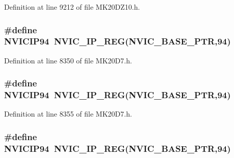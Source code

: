 Definition at line 9212 of file M\+K20\+D\+Z10.\+h.

\subsubsection[{\texorpdfstring{N\+V\+I\+C\+I\+P94}{NVICIP94}}]{\setlength{\rightskip}{0pt plus 5cm}\#define N\+V\+I\+C\+I\+P94~{\bf N\+V\+I\+C\+\_\+\+I\+P\+\_\+\+R\+EG}({\bf N\+V\+I\+C\+\_\+\+B\+A\+S\+E\+\_\+\+P\+TR},94)}\hypertarget{group___n_v_i_c___register___accessor___macros_ga1fdffabe7e9138a3d4d06f44da25cb32}{}\label{group___n_v_i_c___register___accessor___macros_ga1fdffabe7e9138a3d4d06f44da25cb32}


Definition at line 8350 of file M\+K20\+D7.\+h.

\subsubsection[{\texorpdfstring{N\+V\+I\+C\+I\+P94}{NVICIP94}}]{\setlength{\rightskip}{0pt plus 5cm}\#define N\+V\+I\+C\+I\+P94~{\bf N\+V\+I\+C\+\_\+\+I\+P\+\_\+\+R\+EG}({\bf N\+V\+I\+C\+\_\+\+B\+A\+S\+E\+\_\+\+P\+TR},94)}\hypertarget{group___n_v_i_c___register___accessor___macros_ga1fdffabe7e9138a3d4d06f44da25cb32}{}\label{group___n_v_i_c___register___accessor___macros_ga1fdffabe7e9138a3d4d06f44da25cb32}


Definition at line 8355 of file M\+K20\+D7.\+h.

\subsubsection[{\texorpdfstring{N\+V\+I\+C\+I\+P94}{NVICIP94}}]{\setlength{\rightskip}{0pt plus 5cm}\#define N\+V\+I\+C\+I\+P94~{\bf N\+V\+I\+C\+\_\+\+I\+P\+\_\+\+R\+EG}({\bf N\+V\+I\+C\+\_\+\+B\+A\+S\+E\+\_\+\+P\+TR},94)}\hypertarget{group___n_v_i_c___register___accessor___macros_ga1fdffabe7e9138a3d4d06f44da25cb32}{}\label{group___n_v_i_c___register___accessor___macros_ga1fdffabe7e9138a3d4d06f44da25cb32}


